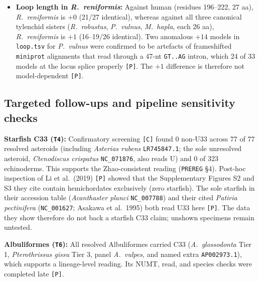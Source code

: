 \documentclass[11pt, a4paper]{article}
\begin{document}
\begin{itemize}[leftmargin=1.4em, itemsep=0.25em]
\item \textbf{Loop length in \textit{R.\ reniformis}:} Against human (residues 196--222, 27 aa), \textit{R.\ reniformis} is $+0$ (21/27 identical), whereas against all three canonical tylenchid sisters (\textit{R.\ robustus}, \textit{P.\ vulnus}, \textit{M.\ hapla}, each 26 aa), \textit{R.\ reniformis} is \textbf{$+1$} (16--19/26 identical). Two anomalous $+14$ models in \texttt{loop.tsv} for \textit{P.\ vulnus} were confirmed to be artefacts of frameshifted \texttt{miniprot} alignments that read through a 47-nt \texttt{GT..AG} intron, which 24 of 33 models at the locus splice properly \texttt{[P]}. The $+1$ difference is therefore not model-dependent \texttt{[P]}.
\end{itemize}

\subsection{Targeted follow-ups and pipeline sensitivity checks}
\textbf{Starfish C33 (\texttt{T4}):} Confirmatory screening \texttt{[C]} found 0 non-U33 across 77 of 77 resolved asteroids (including \textit{Asterias rubens} \texttt{LR745847.1}; the sole unresolved asteroid, \textit{Ctenodiscus crispatus} \texttt{NC\_071876}, also reads U) and 0 of 323 echinoderms. This supports the Zhao-consistent reading (\texttt{PREREG} \S 4). Post-hoc inspection of Li et al.\ (2019) \texttt{[P]} showed that the Supplementary Figures S2 and S3 they cite contain hemichordates exclusively (zero starfish). The sole starfish in their accession table (\textit{Acanthaster planci} \texttt{NC\_007788}) and their cited \textit{Patiria pectinifera} (\texttt{NC\_001627}; Asakawa et al.\ 1995) both read U33 here \texttt{[P]}. The data they show therefore do not back a starfish C33 claim; unshown specimens remain untested.

\textbf{Albuliformes (\texttt{T6}):} All resolved Albuliformes carried C33 (\textit{A.\ glossodonta} Tier 1, \textit{Pterothrissus gissu} Tier 3, panel \textit{A.\ vulpes}, and named extra \texttt{AP002973.1}), which supports a lineage-level reading. Its NUMT, read, and species checks were completed late \texttt{[P]}.
\end{document}
